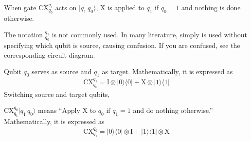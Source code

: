 \documentclass[letterpaper,10pt,english]{jupyterBook}
\begin{document}
\sphinxAtStartPar
When gate CX\(_{q_0}^{q_1}\) acts on \(|q_1\, q_0\rangle\), X is applied to \(q_1\) if \(q_0=1\) and nothing is done otherwise.%
\begin{footnote}[1]\sphinxAtStartFootnote
The notation \(_{q_0}^{q_1}\) is not commonly used.  In many literature, simply  is used without specifying which qubit is source, causing confusion. If you are confused, see the corresponding circuit diagram.
%
\end{footnote} Qubit \(q_0\) serves as source and \(q_1\) as target. Mathematically, it is expressed as
\begin{equation*}
\begin{split}
\text{CX}_{q_0}^{q_1} = \text{I} \otimes |0\rangle\langle 0| + \text{X} \otimes |1\rangle\langle 1|
\end{split}
\end{equation*}
\sphinxAtStartPar
Switching source and target qubits,

\sphinxAtStartPar
CX\(_{q_1}^{q_0}|q_1\, q_0\rangle\) means “Apply X to \(q_0\) if \(q_1=1\) and do nothing otherwise.”  Mathematically, it is expressed as
\begin{equation*}
\begin{split}
\text{CX}_{q_1}^{q_0} = |0\rangle\langle 0| \otimes \text{I}   +   |1\rangle\langle 1| \otimes \text{X}
\end{split}
\end{equation*}
\sphinxAtStartPar
{}
\end{document}
